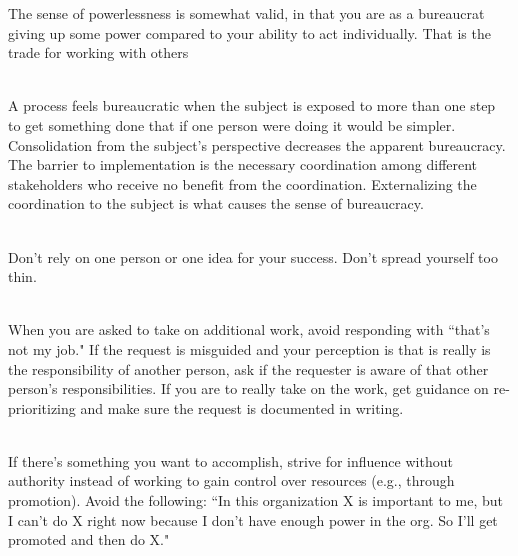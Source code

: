 The sense of powerlessness is somewhat valid, in that you are as a bureaucrat giving up some power compared to your ability to act individually. That is the trade for working with others

\ \\

A process feels bureaucratic when the subject is exposed to more than one step to get something done that if one person were doing it would be simpler. Consolidation from the subject's perspective decreases the apparent bureaucracy. The barrier to implementation is the necessary coordination among different stakeholders who receive no benefit from the coordination. Externalizing the coordination to the subject is what causes the sense of bureaucracy. 


\ \\

Don't rely on one person or one idea for your success. Don't spread yourself too thin. 

\ \\

When you are asked to take on additional work, avoid responding with ``that's not my job." If the request is misguided and your perception is that is really is the responsibility of another person, ask if the requester is aware of that other person's responsibilities. If you are to really take on the work, get guidance on re-prioritizing and make sure the request is documented in writing. 

\ \\

If there's something you want to accomplish, strive for influence without authority instead of working to gain control over resources (e.g., through promotion). Avoid the following: ``In this organization X is important to me, but I can't do X right now because I don't have enough power in the org. So I'll get promoted and then do X."

\ \\

